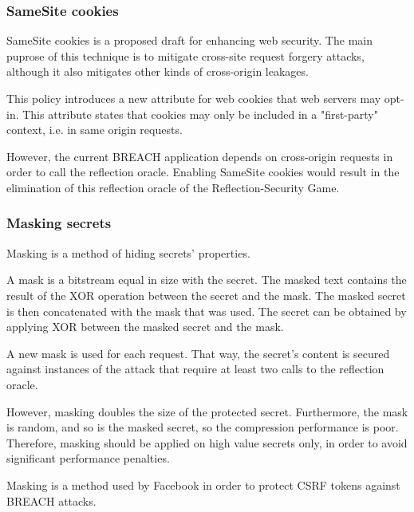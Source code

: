 \documentclass[conference, letterpaper, 10pt]{IEEEtran}
\begin{document}
\subsubsection{SameSite cookies}\label{subsec:samesite}
SameSite cookies \cite{c15} is a proposed draft for enhancing web security. The
main puprose of this technique is to mitigate cross-site request forgery
attacks, although it also mitigates other kinds of cross-origin leakages.

This policy introduces a new attribute for web cookies that web servers may
opt-in. This attribute states that cookies may only be included in a
"first-party" context, i.e. in same origin requests.

However, the current BREACH application depends on cross-origin requests in
order to call the reflection oracle. Enabling SameSite cookies would result in
the elimination of this reflection oracle of the Reflection-Security Game.

\subsubsection{Masking secrets}\label{subsec:masking}
Masking is a method of hiding secrets' properties.

A mask is a bitstream equal in size with the secret. The masked text contains
the result of the XOR operation between the secret and the mask. The masked
secret is then concatenated with the mask that was used. The secret can be
obtained by applying XOR between the masked secret and the mask.

A new mask is used for each request. That way, the secret's content is secured
against instances of the attack that require at least two calls to the
reflection oracle.

However, masking doubles the size of the protected secret. Furthermore, the mask
is random, and so is the masked secret, so the compression performance is poor.
Therefore, masking should be applied on high value secrets only, in order to
avoid significant performance penalties.

Masking is a method used by Facebook \cite{c16} in order to protect CSRF tokens
against BREACH attacks.
\end{document}

